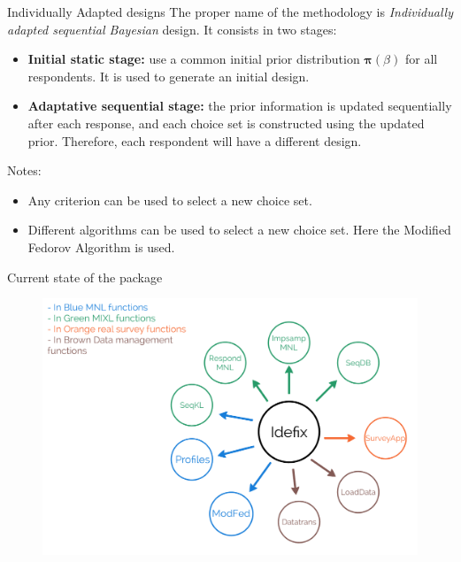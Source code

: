 \documentclass[11pt,t]{beamer}
\begin{document}
\begin{frame}[fragile]{Individually Adapted designs}
The proper name of the methodology is \textit{Individually adapted sequential Bayesian} design. It consists in two stages:
	\begin{itemize}
		\item \textbf{Initial static stage:} use a common initial prior distribution $\pmb{\pi}(\beta)$ for all respondents. It is used to generate an initial design.
		\item \textbf{Adaptative sequential stage:} the prior information  is updated sequentially after each response, and each choice set is constructed using the updated prior. Therefore, each respondent will have a different design.
	\end{itemize}
	\begin{alertblock}{Notes:}
	\begin{itemize}
		\item Any criterion can be used to select a new choice set.
		\item Different algorithms can be used to select a new choice set. Here the Modified Fedorov Algorithm is used.
	\end{itemize}
	\end{alertblock}
\end{frame}

\begin{frame}[fragile]{Current state of the package}
\begin{figure}
			\centering
			\includegraphics[scale = .5]{mygraphics/CurrentState.png}
		\end{figure}
\end{frame}
\end{document}
